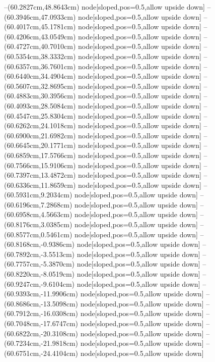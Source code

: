 --(60.2827cm,48.8643cm) node[sloped,pos=0.5,allow upside down]{\ArrowIn}
--(60.3946cm,47.0933cm) node[sloped,pos=0.5,allow upside down]{\ArrowIn}
--(60.4017cm,45.1781cm) node[sloped,pos=0.5,allow upside down]{\ArrowIn}
--(60.4206cm,43.0549cm) node[sloped,pos=0.5,allow upside down]{\ArrowIn}
--(60.4727cm,40.7010cm) node[sloped,pos=0.5,allow upside down]{\ArrowIn}
--(60.5354cm,38.3332cm) node[sloped,pos=0.5,allow upside down]{\ArrowIn}
--(60.6357cm,36.7601cm) node[sloped,pos=0.5,allow upside down]{\ArrowIn}
--(60.6440cm,34.4904cm) node[sloped,pos=0.5,allow upside down]{\ArrowIn}
--(60.5607cm,32.8695cm) node[sloped,pos=0.5,allow upside down]{\ArrowIn}
--(60.4883cm,30.3956cm) node[sloped,pos=0.5,allow upside down]{\ArrowIn}
--(60.4093cm,28.5084cm) node[sloped,pos=0.5,allow upside down]{\ArrowIn}
--(60.4547cm,25.8304cm) node[sloped,pos=0.5,allow upside down]{\ArrowIn}
--(60.6262cm,24.1018cm) node[sloped,pos=0.5,allow upside down]{\ArrowIn}
--(60.6900cm,21.6982cm) node[sloped,pos=0.5,allow upside down]{\ArrowIn}
--(60.6645cm,20.1771cm) node[sloped,pos=0.5,allow upside down]{\ArrowIn}
--(60.6859cm,17.5766cm) node[sloped,pos=0.5,allow upside down]{\ArrowIn}
--(60.7566cm,15.9106cm) node[sloped,pos=0.5,allow upside down]{\ArrowIn}
--(60.7397cm,13.4872cm) node[sloped,pos=0.5,allow upside down]{\ArrowIn}
--(60.6336cm,11.8659cm) node[sloped,pos=0.5,allow upside down]{\ArrowIn}
--(60.5931cm,9.2034cm) node[sloped,pos=0.5,allow upside down]{\ArrowIn}
--(60.6196cm,7.2868cm) node[sloped,pos=0.5,allow upside down]{\ArrowIn}
--(60.6958cm,4.5663cm) node[sloped,pos=0.5,allow upside down]{\ArrowIn}
--(60.8176cm,3.0385cm) node[sloped,pos=0.5,allow upside down]{\ArrowIn}
--(60.8577cm,0.5461cm) node[sloped,pos=0.5,allow upside down]{\ArrowIn}
--(60.8168cm,-0.9386cm) node[sloped,pos=0.5,allow upside down]{\ArrowIn}
--(60.7892cm,-3.5513cm) node[sloped,pos=0.5,allow upside down]{\ArrowIn}
--(60.7757cm,-5.3870cm) node[sloped,pos=0.5,allow upside down]{\ArrowIn}
--(60.8220cm,-8.0519cm) node[sloped,pos=0.5,allow upside down]{\ArrowIn}
--(60.9247cm,-9.6104cm) node[sloped,pos=0.5,allow upside down]{\ArrowIn}
--(60.9393cm,-11.9906cm) node[sloped,pos=0.5,allow upside down]{\ArrowIn}
--(60.8686cm,-13.5098cm) node[sloped,pos=0.5,allow upside down]{\ArrowIn}
--(60.7912cm,-16.0308cm) node[sloped,pos=0.5,allow upside down]{\ArrowIn}
--(60.7048cm,-17.6747cm) node[sloped,pos=0.5,allow upside down]{\ArrowIn}
--(60.6822cm,-20.3108cm) node[sloped,pos=0.5,allow upside down]{\ArrowIn}
--(60.7234cm,-21.9818cm) node[sloped,pos=0.5,allow upside down]{\ArrowIn}
--(60.6751cm,-24.4104cm) node[sloped,pos=0.5,allow upside down]{\ArrowIn}
